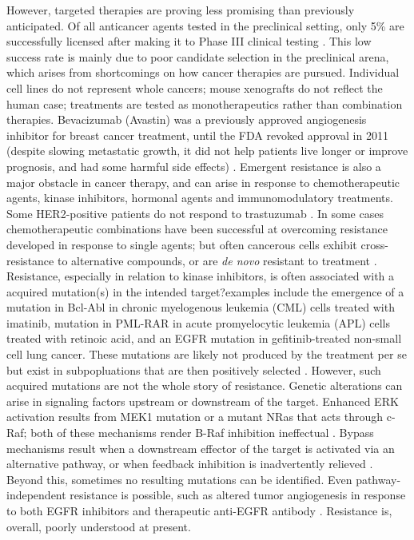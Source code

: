 \documentclass[12pt]{article}
\begin{document}
However, targeted therapies are proving less promising than previously anticipated. Of all anticancer agents tested in the preclinical setting, only 5\% are successfully licensed after making it to Phase III clinical testing \cite{Hutchinson2011}. This low success rate is mainly due to poor candidate selection in the preclinical arena, which arises from shortcomings on how cancer therapies are pursued. Individual cell lines do not represent whole cancers; mouse xenografts do not reflect the human case; treatments are tested as monotherapeutics rather than combination therapies. Bevacizumab (Avastin) was a previously approved angiogenesis inhibitor for breast cancer treatment, until the FDA revoked approval in 2011 (despite slowing metastatic growth, it did not help patients live longer or improve prognosis, and had some harmful side effects) \cite{Pollack2011}. Emergent resistance is also a major obstacle in cancer therapy, and can arise in response to chemotherapeutic agents, kinase inhibitors, hormonal agents and immunomodulatory treatments. Some HER2-positive patients do not respond to trastuzumab \cite{Hutchinson2011}. In some cases chemotherapeutic combinations have been successful at overcoming resistance developed in response to single agents; but often cancerous cells exhibit cross-resistance to alternative compounds, or are \textit{de novo} resistant to treatment \cite{Garraway2012}. Resistance, especially in relation to kinase inhibitors, is often associated with a acquired mutation(s) in the intended target?examples include the emergence of a mutation in Bcl-Abl in chronic myelogenous leukemia (CML) cells treated with imatinib, mutation in PML-RAR in acute promyelocytic leukemia (APL) cells treated with retinoic acid, and an EGFR mutation in gefitinib-treated non-small cell lung cancer. These mutations are likely not produced by the treatment per se but exist in subpopluations that are then positively selected \cite{Garraway2012}. However, such acquired mutations are not the whole story of resistance. Genetic alterations can arise in signaling factors upstream or downstream of the target. Enhanced ERK activation results from MEK1 mutation or a mutant NRas that acts through c-Raf; both of these mechanisms render B-Raf inhibition ineffectual \cite{Garraway2012}. Bypass mechanisms result when a downstream effector of the target is activated via an alternative pathway, or when feedback inhibition is inadvertently relieved \cite{Garraway2012}. Beyond this, sometimes no resulting mutations can be identified. Even pathway-independent resistance is possible, such as altered tumor angiogenesis in response to both EGFR inhibitors and therapeutic anti-EGFR antibody \cite{Garraway2012}. Resistance is, overall, poorly understood at present.
\end{document}
